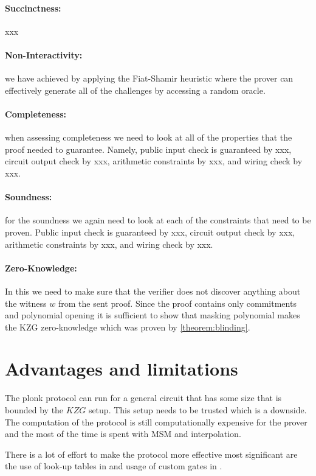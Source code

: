 \paragraph{Succinctness:} xxx

\paragraph{Non-Interactivity:} we have achieved by applying the \cite{fiat-shamir} Fiat-Shamir heuristic where the prover can effectively generate all of the challenges by accessing a random oracle. 

\paragraph{Completeness:} when assessing completeness we need to look at all of the properties that the proof needed to guarantee. Namely, public input check is guaranteed by xxx, circuit output check by xxx, arithmetic constraints by xxx, and wiring check by xxx.

\paragraph{Soundness:} for the soundness we again need to look at each of the constraints that need to be proven. Public input check is guaranteed by xxx, circuit output check by xxx, arithmetic constraints by xxx, and wiring check by xxx.

\paragraph{Zero-Knowledge:} In this we need to make sure that the verifier does not discover anything about the witness $w$ from the sent proof. Since the proof contains only commitments and polynomial opening it is sufficient to show that masking polynomial makes the KZG zero-knowledge which was proven by \cref{theorem:blinding}.

\section{Advantages and limitations}

The plonk protocol can run for a general circuit that has some size that is bounded by the $KZG$ setup. This setup needs to be trusted which is a downside. The computation of the protocol is still computationally expensive for the prover and the most of the time is spent with MSM and interpolation.

There is a lot of effort to make the protocol more effective most significant are the use of look-up tables in \cite{plookup} and usage of custom gates in \cite{HyperPlonk}. 



